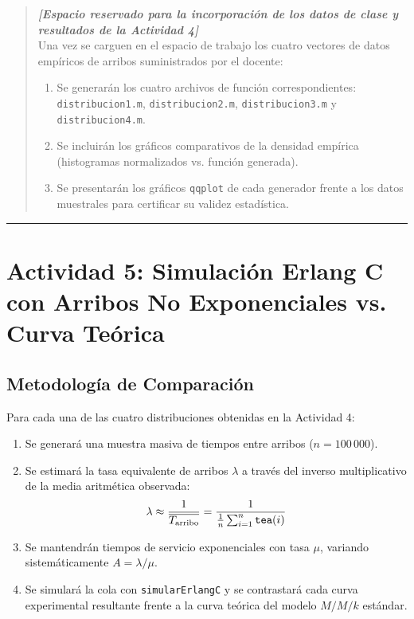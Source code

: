 \documentclass[11pt, a4paper]{article}
\begin{document}
\begin{quote}
\textit{\textbf{[Espacio reservado para la incorporación de los datos de clase y resultados de la Actividad 4]}}\\
Una vez se carguen en el espacio de trabajo los cuatro vectores de datos empíricos de arribos suministrados por el docente:
\begin{enumerate}
    \item Se generarán los cuatro archivos de función correspondientes: \texttt{distribucion1.m}, \texttt{distribucion2.m}, \texttt{distribucion3.m} y \texttt{distribucion4.m}.
    \item Se incluirán los gráficos comparativos de la densidad empírica (histogramas normalizados vs. función generada).
    \item Se presentarán los gráficos \texttt{qqplot} de cada generador frente a los datos muestrales para certificar su validez estadística.
\end{enumerate}
\end{quote}

\vspace{1em}
\hrule
\vspace{1em}

\section{Actividad 5: Simulación Erlang C con Arribos No Exponenciales vs. Curva Teórica}

\subsection{Metodología de Comparación}
Para cada una de las cuatro distribuciones obtenidas en la Actividad 4:
\begin{enumerate}
    \item Se generará una muestra masiva de tiempos entre arribos ($n = 100\,000$).
    \item Se estimará la tasa equivalente de arribos $\lambda$ a través del inverso multiplicativo de la media aritmética observada:
    \begin{equation}
    \lambda \approx \frac{1}{\overline{T_{\text{arribo}}}} = \frac{1}{\frac{1}{n} \sum_{i=1}^{n} \text{\texttt{tea}}(i)}
    \end{equation}
    \item Se mantendrán tiempos de servicio exponenciales con tasa $\mu$, variando sistemáticamente $A = \lambda/\mu$.
    \item Se simulará la cola con \texttt{simularErlangC} y se contrastará cada curva experimental resultante frente a la curva teórica del modelo $M/M/k$ estándar.
\end{enumerate}
\end{document}
